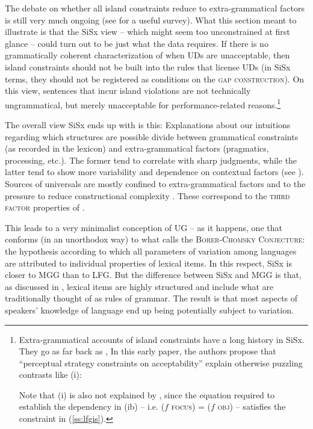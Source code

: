 \documentclass[output=paper,hidelinks]{langscibook}
\begin{document}
The debate on whether all island constraints reduce to extra-grammatical factors is still very much ongoing (see \citet{newmeyer2016nonsyntactic} for a useful survey). What this section meant to illustrate is that the  SiSx view -- which might seem too unconstrained at first glance -- could turn out to be just what the data requires. If there is no grammatically coherent characterization of when UDs are unacceptable, then island constraints should not be built into the rules that license UDs (in SiSx terms, they should not be registered as conditions on the \textsc{gap construction}). On this view, sentences that incur island violations are not technically ungrammatical, but merely unacceptable for performance-related reasons.\footnote{Extra-grammatical accounts of island constraints have a long history in SiSx. They go as far back as \citet{jackendoff1972a-reconsideration}, In this early paper, the authors propose that ``perceptual strategy constraints on acceptability'' explain otherwise puzzling contrasts like (i):

\begin{exe}
\label{ss:dat}
\begin{xlist}
\end{xlist}
\end{exe}


Note that (i) is also not explained by \citet{kaplzaen89}, since the equation required to establish the dependency in (ib) -- i.e. ($f$ \textsc{focus}) = ($f$ \textsc{obj}) -- satisfies the constraint in (\ref{ss:lfgis}).}


The overall view SiSx ends up with is this: Explanations about our intuitions regarding which structures are possible divide between grammatical constraints (as recorded in the lexicon) and extra-grammatical factors (pragmatics, processing, etc.). The former tend to correlate with sharp judgments, while the latter tend to show more variability and dependence on contextual factors (see \citealt{culicover2013simplersyntax}). Sources of universals are mostly confined to extra-grammatical factors and to the pressure to reduce constructional complexity \citep{culicover2013grammar}. These correspond to the \textsc{third factor} properties of \citet{chomsky2005three}. 

This leads to a very minimalist conception of UG -- as it happens, one that conforms (in an unorthodox way) to what \citet[353]{baker2008macroparameter} calls the \textsc{Borer-Chomsky Conjecture}: the hypothesis according to which all parameters of variation among languages are attributed to individual properties of lexical items. In this respect, SiSx is closer to MGG than to LFG. But the difference between SiSx and MGG is that, as discussed in , lexical items are highly structured and include what are traditionally thought of as rules of grammar. The result is that most aspects of speakers' knowledge of language end up being potentially subject to variation.
\end{document}
